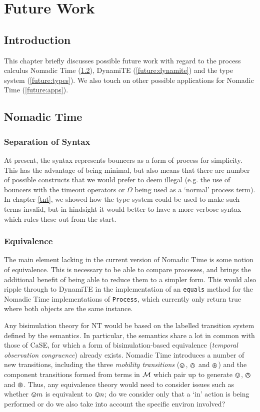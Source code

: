 \chapter{Future Work}
\label{futurework}

\section{Introduction}

This chapter briefly discusses possible future work with regard to the
process calculus Nomadic Time (\ref{future:nt}), DynamiTE
(\ref{future:dynamite}) and the type system (\ref{future:types}).  We
also touch on other possible applications for Nomadic Time
(\ref{future:apps}).

\section{Nomadic Time}
\label{future:nt}

\subsection{Separation of Syntax}

At present, the syntax represents bouncers as a form of process for
simplicity.  This has the advantage of being minimal, but also means
that there are number of possible constructs that we would prefer to
deem illegal (e.g. the use of bouncers with the timeout operators or
$\Omega$ being used as a `normal' process term).  In chapter
\ref{tnt}, we showed how the type system could be used to make such
terms invalid, but in hindsight it would better to have a more verbose
syntax which rules these out from the start.

\subsection{Equivalence}
\label{future:equiv}

The main element lacking in the current version of Nomadic Time is
some notion of equivalence.  This is necessary to be able to compare
processes, and brings the additional benefit of being able to reduce
them to a simpler form.  This would also ripple through to DynamiTE in
the implementation of an \texttt{equals} method for the Nomadic Time
implementations of \texttt{Process}, which currently only return true
where both objects are the same instance.

Any bisimulation theory for NT would be based on the labelled
transition system defined by the semantics.  In particular, the
semantics share a lot in common with those of CaSE, for which a form
of bisimulation-based equivalence (\emph{temporal observation
  congruence}) already exists.  Nomadic Time introduces a number of
new transitions, including the three \emph{mobility transitions}
($\varovee$, $\varowedge$ and $\varoast$) and the component transitions formed
from terms in $\text{$\mathcal{M}$}$ which pair up to generate $\varovee$, $\varowedge$ and
$\varoast$.  Thus, any equivalence theory would need to consider issues
such as whether $\varovee m$ is equivalent to $\varovee n$; do we
consider only that a `in' action is being performed or do we also take
into account the specific environ involved?

